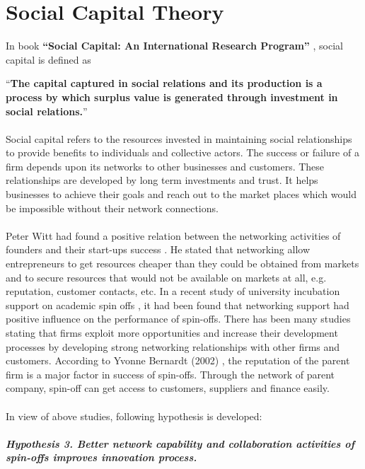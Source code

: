 \section{Social Capital Theory\label{sec:capital-based-theory}}
In book \textbf{“Social Capital: An International Research Program”} \cite{41}, social capital is defined as 

``\textbf{The capital captured in social relations and its production is a process by which surplus value is generated through investment in social relations.}''
\\
\\
Social capital refers to the resources invested in maintaining social relationships to provide benefits
to individuals and collective actors. The success or failure of a firm depends upon its networks to
other businesses and customers. These relationships are developed by long term investments and
trust. It helps businesses to achieve their goals and reach out to the market places which would be
impossible without their network connections.
\\
\\
Peter Witt had found a positive relation between the networking activities of founders and their
start-ups success \cite{42}. He stated that networking allow entrepreneurs to get resources cheaper than they
could be obtained from markets and to secure resources that would not be available on markets at all,
e.g. reputation, customer contacts, etc. In a recent study of university incubation support on
academic spin offs \cite{43}, it had been found that networking support had positive influence on the
performance of spin-offs. There has been many studies \cite{44}\cite{45} stating that firms exploit more
opportunities and increase their development processes by developing strong networking
relationships with other firms and customers. According to Yvonne Bernardt (2002) \cite{46}, the reputation
of the parent firm is a major factor in success of spin-offs. Through the network of parent
company, spin-off can get access to customers, suppliers and finance easily.
\\
\\
In view of above studies, following hypothesis is developed:
\\
\\
\textbf{\textit{Hypothesis 3. Better network capability and collaboration activities of spin-offs improves
innovation process.}}

